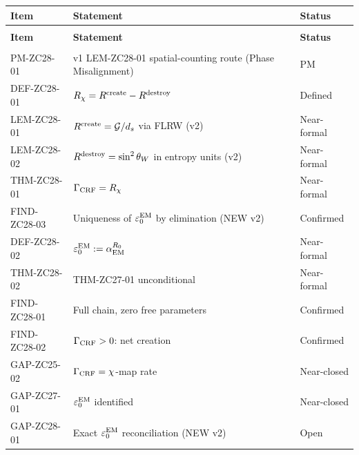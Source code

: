 \documentclass[12pt, a4paper]{article}
\begin{document}
\begin{derivedbox}[title={Z-Programme Status (ZC28 v2)}]
{\small
\setlength{\LTpre}{4pt}
\setlength{\LTpost}{4pt}
\renewcommand{\arraystretch}{1.30}
\begin{longtable}{>{\raggedright\arraybackslash}p{3.0cm}
                  >{\raggedright\arraybackslash}p{6.8cm}
                  >{\centering\arraybackslash}p{1.7cm}}
\toprule
\textbf{Item} & \textbf{Statement} & \textbf{Status} \\
\midrule
\endfirsthead
\multicolumn{3}{l}{\small\textit{(continued)}}\\[4pt]
\toprule
\textbf{Item} & \textbf{Statement} & \textbf{Status} \\
\midrule
\endhead
\midrule
\multicolumn{3}{r}{\small\textit{(continues)}}\\
\endfoot
\bottomrule
\endlastfoot
PM-ZC28-01   & v1 LEM-ZC28-01 spatial-counting route
  (Phase Misalignment) & PM \\
\midrule
DEF-ZC28-01  & $R_\chi = R^{\rm create} - R^{\rm destroy}$
  & Defined \\
LEM-ZC28-01  & $R^{\rm create} = \mathcal{G}/d_s$
  via FLRW (v2) & Near-formal \\
LEM-ZC28-02  & $R^{\rm destroy} = \sin^2\theta_W$
  in entropy units (v2) & Near-formal \\
THM-ZC28-01  & $\Gamma_{\rm CRF} = R_\chi$
  & Near-formal \\
\midrule
FIND-ZC28-03 & Uniqueness of $\varepsilon_0^{\rm EM}$
  by elimination (NEW v2) & Confirmed \\
DEF-ZC28-02  & $\varepsilon_0^{\rm EM} := \alpha_{\rm EM}^{R_0}$
  & Near-formal \\
THM-ZC28-02  & THM-ZC27-01 unconditional & Near-formal \\
FIND-ZC28-01 & Full chain, zero free parameters
  & Confirmed \\
FIND-ZC28-02 & $\Gamma_{\rm CRF} > 0$: net creation
  & Confirmed \\
\midrule
GAP-ZC25-02  & $\Gamma_{\rm CRF} = \chi$-map rate
  & Near-closed \\
GAP-ZC27-01  & $\varepsilon_0^{\rm EM}$ identified
  & Near-closed \\
GAP-ZC28-01  & Exact $\varepsilon_0^{\rm EM}$
  reconciliation (NEW v2) & Open \\
\end{longtable}
}
\vspace{-6pt}
\end{derivedbox}
\end{document}
